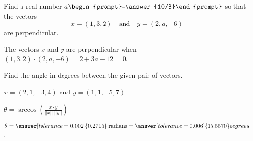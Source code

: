 \documentclass{ximera}
\begin{document}



\problemlabel

\begin{exercise} \label{c1.4.2}
Find a real number $a\begin{prompt}=\answer{10/3}\end{prompt}$ so that the vectors
\[
x = (1,3,2) \quad\mbox{and}\quad y = (2,a,-6)
\]
are perpendicular.
\begin{hint}
  The vectors $x$ and $y$ are perpendicular when
$(1,3,2) \cdot (2,a,-6) = 2 + 3a - 12 = 0$.
\end{hint}

\end{exercise}





\matlabproblemlabel

\noindent Find the angle in degrees between the given pair of vectors.

\begin{computerExercise} \label{c1.4.6a}
$x=(2,1,-3,4)$ and $y=(1,1,-5,7)$.

\begin{hint}
\ans $\theta = \arccos \left(\frac{x \cdot y}{||x||\;||y||}\right)$
\end{hint}

\begin{solution}
\ans $\theta =
\answer[tolerance=0.002]{0.2715} \; \mbox{radians} = \answer[tolerance=0.006]{15.5570} degrees$.

\end{solution}

\end{computerExercise}


\end{document}
